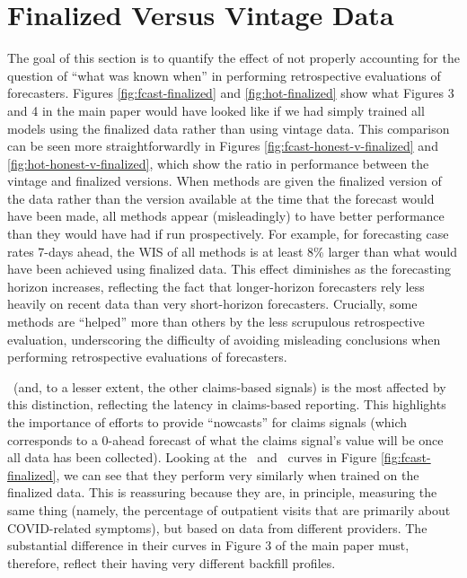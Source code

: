 \section{Finalized Versus Vintage Data}

The goal of this section is to quantify the effect of not properly accounting
for the question of ``what was known when'' in performing retrospective
evaluations of forecasters.  Figures \ref{fig:fcast-finalized} and
\ref{fig:hot-finalized} show what Figures 3 and 4 in the main paper would have
looked like if we had simply trained all models using the finalized data rather
than using vintage data.  This comparison can be seen more straightforwardly in
Figures \ref{fig:fcast-honest-v-finalized} and \ref{fig:hot-honest-v-finalized},
which show the ratio in performance between the vintage and finalized versions.
When methods are given the finalized version of the data rather than the version
available at the time that the forecast would have been made, all methods appear
(misleadingly) to have better performance than they would have had if run
prospectively.  For example, for forecasting case rates 7-days ahead, the WIS of
all methods is at least 8\% larger than what would have been achieved using
finalized data.  This effect diminishes as the forecasting horizon increases,
reflecting the fact that longer-horizon forecasters rely less heavily on recent
data than very short-horizon forecasters.  Crucially, some methods are
``helped'' more than others by the less scrupulous retrospective evaluation,
underscoring the difficulty of avoiding misleading conclusions when performing
retrospective evaluations of forecasters.

\chngcli~(and, to a lesser extent, the other claims-based signals) is the most
affected by this distinction, reflecting the latency in claims-based reporting.
This highlights the importance of efforts to provide ``nowcasts'' for claims
signals (which corresponds to a 0-ahead forecast of what the claims signal's
value will be once all data has been collected). Looking at the \chngcli~and
\dv~curves in Figure \ref{fig:fcast-finalized}, we can see that they perform
very similarly when trained on the finalized data.  This is reassuring because
they are, in principle, measuring the same thing (namely, the percentage of
outpatient visits that are primarily about COVID-related symptoms), but based on
data from different providers.  The substantial difference in their curves in
Figure 3 of the main paper must, therefore, reflect their having very different
backfill profiles. 
  
